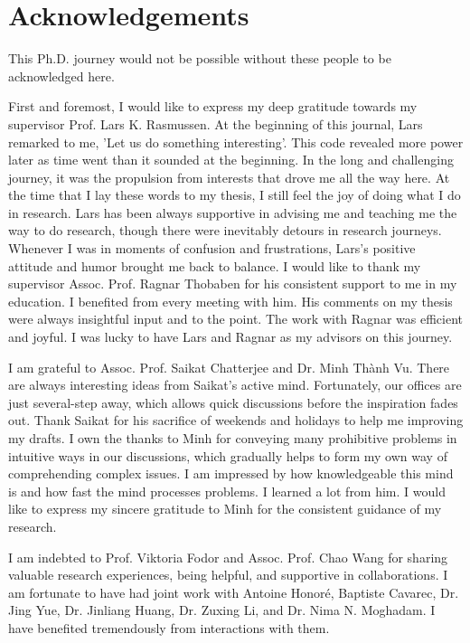 \chapter{Acknowledgements}
This Ph.D. journey would not be possible without these people to be acknowledged here.

First and foremost, I would like to express my deep gratitude towards my supervisor Prof. Lars K. Rasmussen. At the beginning of this journal, Lars remarked to me, 'Let us do something interesting'. This code revealed more power later as time went than it sounded at the beginning. In the long and challenging journey, it was the propulsion from interests that drove me all the way here. At the time that I lay these words to my thesis, I still feel the joy of doing what I do in research. Lars has been always supportive in advising me and teaching me the way to do research, though there were inevitably detours in research journeys. Whenever I was in moments of confusion and frustrations, Lars's positive attitude and humor brought me back to balance.
I would like to thank my supervisor Assoc. Prof. Ragnar Thobaben for his consistent support to me in my education. I benefited from every meeting with him. His comments on my thesis were always insightful input and to the point. The work with Ragnar was efficient and joyful. I was lucky to have Lars and Ragnar as my advisors on this journey.

I am grateful to Assoc. Prof. Saikat Chatterjee and Dr. Minh Th\`{a}nh Vu. There are always interesting ideas from Saikat's active mind. Fortunately, our offices are just several-step away, which allows quick discussions before the inspiration fades out. Thank Saikat for his sacrifice of weekends and holidays to help me improving my drafts.
I own the thanks to Minh for conveying many prohibitive problems in intuitive ways in our discussions, which gradually helps to form my own way of comprehending complex issues. I am impressed by how knowledgeable this mind is and how fast the mind processes problems. I learned a lot from him. I would like to express my sincere gratitude to Minh for the consistent guidance of my research.

I am indebted to Prof. Viktoria Fodor and Assoc. Prof. Chao Wang for sharing valuable research experiences, being helpful, and supportive in collaborations. I am fortunate to have had joint work with Antoine Honor{\'e}, Baptiste Cavarec, Dr. Jing Yue, Dr. Jinliang Huang, Dr. Zuxing Li, and Dr. Nima N. Moghadam. I have benefited tremendously from interactions with them.

